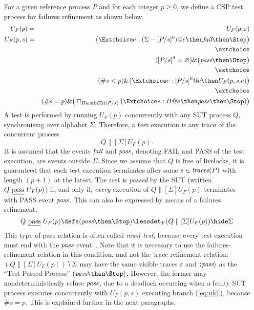 For a given reference process $P$ and for each integer $p\ge 0$, we define a
CSP test process for failures refinement as shown below.
%
\begin{eqnarray}
U_F(p) & = & U_F(p,\varepsilon)
\\
U_F(p,s) & = & \big( \Extchoice e:(\Sigma - [P/s]^0) @ e \then \efail\then \Stop \big)
\label{eq:ufa}
\\ & & \extchoice \nonumber
\\ & & ([P/s]^0 = \varnothing)    \&   \big( \epass \then \Stop \big)
\label{eq:ufb}
\\ & & \extchoice \nonumber
\\ & & (\#s < p) \& \big( \Extchoice e:[P/s]^0 @ e \then U_F(p,s.e) \big)
\label{eq:ufc}
\\ & & \extchoice \nonumber
\\ & & (\#s = p) \& \big( \sqcap_{H\in\text{minHit}(P/s)} ( \Extchoice e:H @ e \then \epass \then\Stop   )  \big)
\label{eq:ufd}
\end{eqnarray}
%
A test is performed by running $U_F(p)$ concurrently with any SUT process $Q$,
synchronising over alphabet $\Sigma$. Therefore, a test execution is any
trace of the concurrent process
\[
Q\parallel[\Sigma] U_F(p).
\]
It is assumed that the events ${\text{\it fail}}$ and ${\text{\it pass}}$, denoting FAIL and PASS
of the test execution, are events outside $\Sigma$. Since we assume that $Q$
is free of livelocks, it is guaranteed that each test execution terminates
after some $s\in\text{\it traces}(P)$ with length $(p+1)$ at the latest. The test is
\emph{passed} by the SUT (written $Q\ \underline{\text{pass}}\ U_F(p)$) if, and only if, {\it
every} execution of $Q\parallel[\Sigma] U_F(p)$ terminates with PASS event
${\text{\it pass}}$. This can also be  expressed by means of a failures refinement.
\[
Q\ \pass\ U_F(p) \defs (\epass\then\Stop) \lessdet_F (Q\parallel[\Sigma] U_F(p)) \hide \Sigma
\]
This type of pass relation is often called \emph{must test}, because every
test execution must end with the ${\text{\it pass}}$
event~\cite{Hennessy:1988:ATP:50497}. Note that it is necessary to use the
failures-refinement relation in this condition, and not the trace-refinement
relation:~$(Q\parallel[\Sigma] U_F(p)) \hide \Sigma$ may have  the same
visible traces $\varepsilon$ and $\langle {\text{\it pass}}\rangle$ as the ``Test Passed
Process'' $(\epass\then\Stop)$. However, the former may nondeterministically
refuse ${\text{\it pass}}$, due to a deadlock occurring when a faulty SUT process
executes concurrently with $U_F(p,s)$ executing branch (\ref{eq:ufd}),
because $\#s = p$. This is explained further in the next paragraphs.

